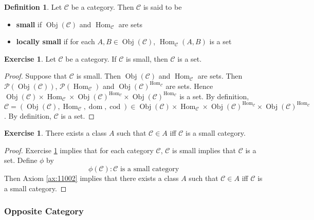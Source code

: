 \documentclass[12pt]{amsart}
\theoremstyle{definition}
\newtheorem{defn}[definition]{Definition}
\newtheorem{ex}[definition]{Exercise}
\newcommand{\MC}{\mathcal{C}}
\newcommand{\MP}{\mathcal{P}}
\DeclareMathOperator{\dom}{dom}
\DeclareMathOperator{\cod}{cod}
\DeclareMathOperator{\Obj}{Obj}
\DeclareMathOperator{\Hom}{Hom}
\DeclareMathOperator*{\0}{\mbf{0}}
\DeclareMathOperator*{\1}{\mbf{1}}
\newcommand{\lex}[1]{\label{ex:#1}}
\newcommand{\ld}[1]{\label{defn:#1}}
\newcommand{\rex}[1]{Exercise \ref{ex:#1}}
\newcommand{\rax}[1]{Axiom \ref{ax:#1}}
\begin{document}
	\begin{defn} \ld{12002}
		Let $\MC$ be a category. Then $\MC$ is said to be 
		\begin{itemize}
			\item \textbf{small} if $\Obj(\MC)$ and $\Hom_{\MC}$ are sets
			\item \textbf{locally small} if for each $A,B \in \Obj(\MC)$, $\Hom_{\MC}(A,B)$ is a set 
		\end{itemize}
	\end{defn}

	\begin{ex} \lex{12003}
		Let $\MC$ be a category. If $\MC$ is small, then $\MC$ is a set. 
	\end{ex}

	\begin{proof}
		Suppose that $\MC$ is small. Then $\Obj(\MC)$ and $\Hom_{\MC}$ are sets. Then $\MP(\Obj(\MC))$, $\MP(\Hom_{\MC})$ and $\Obj(\MC)^{\Hom_{\MC}}$ are sets. Hence $\Obj(\MC) \times \Hom_{\MC} \times \Obj(\MC)^{\Hom_{\MC}} \times \Obj(\MC)^{\Hom_{\MC}}$ is a set. By definition, $\MC = (\Obj(\MC), \Hom_{\MC}, \dom, \cod) \in \Obj(\MC) \times \Hom_{\MC} \times \Obj(\MC)^{\Hom_{\MC}} \times \Obj(\MC)^{\Hom_{\MC}}$. By definition, $\MC$ is a set. 
	\end{proof}
	
	\begin{ex} \lex{12004}
		There exists a class $A$ such that $\MC \in A$ iff $\MC$ is a small category. 
	\end{ex}

	\begin{proof}
		\rex{12003} implies that for each category $\MC$, $\MC$ is small implies that $\MC$ is a set. Define $\phi$ by $$\phi(\MC): \MC \text{ is a small category} $$ 
		Then \rax{11002} implies that there exists a class $A$ such that $\MC \in A$ iff $\MC$ is a small category.  
	\end{proof}





















	
	
	\subsubsection{Opposite Category}
\end{document}
